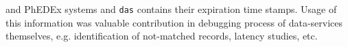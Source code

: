 \documentclass[1p,times]{elsarticle}
\begin{document}
and PhEDEx systems and \verb+das+ contains their expiration time stamps.
Usage of this information was valuable contribution in debugging process of
data-services themselves, e.g. identification of not-matched records, 
latency studies, etc.

\end{document}
